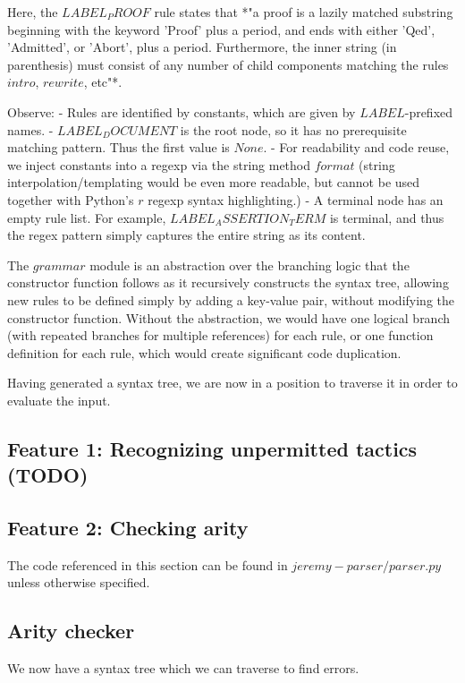 Here, the $LABEL_PROOF$ rule states that *"a proof is a lazily matched substring beginning with the keyword 'Proof' plus a period, and ends with either 'Qed', 'Admitted', or 'Abort', plus a period. Furthermore, the inner string (in parenthesis) must consist of any number of child components matching the rules $intro$, $rewrite$, etc"*.

Observe:
- Rules are identified by constants, which are given by $LABEL$-prefixed names.
- $LABEL_DOCUMENT$ is the root node, so it has no prerequisite matching pattern. Thus the first value is $None$.
- For readability and code reuse, we inject constants into a regexp via the string method $format$ (string interpolation/templating would be even more readable, but cannot be used together with Python's $r$ regexp syntax highlighting.)
- A terminal node has an empty rule list. For example, $LABEL_ASSERTION_TERM$ is terminal, and thus the regex pattern simply captures the entire string as its content.

The $grammar$ module is an abstraction over the branching logic that the constructor function follows as it recursively constructs the syntax tree, allowing new rules to be defined simply by adding a key-value pair, without modifying the constructor function. Without the abstraction, we would have one logical branch (with repeated branches for multiple references) for each rule, or one function definition for each rule, which would create significant code duplication.

Having generated a syntax tree, we are now in a position to traverse it in order to evaluate the input.

\subsection{Feature 1: Recognizing unpermitted tactics  (TODO)}


\subsection{Feature 2: Checking arity}

The code referenced in this section can be found in $jeremy-parser/parser.py$ unless otherwise specified.

\subsection{Arity checker}
We now have a syntax tree which we can traverse to find errors.


